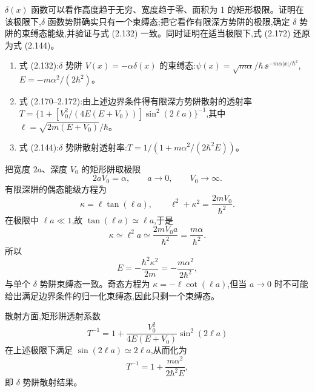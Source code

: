 \begin{question}
$\delta(x)$ 函数可以看作高度趋于无穷、宽度趋于零、面积为 1 的矩形极限。证明在该极限下,$\delta$ 函数势阱确实只有一个束缚态;把它看作有限深方势阱的极限,确定 $\delta$ 势阱的束缚态能级,并验证与式 (2.132) 一致。同时证明在适当极限下,式 (2.172) 还原为式 (2.144)。

\par\smallskip
{}
\begin{enumerate}[leftmargin=2.2em,itemsep=0.12em,topsep=0.12em,parsep=0pt]
\item 式 (2.132):$\delta$ 势阱 $V(x)=-\alpha\delta(x)$ 的束缚态:$\psi(x)=\sqrt{m\alpha}/\hbar\,\ee^{-m\alpha|x|/\hbar^2}$,$E=-m\alpha^2/(2\hbar^2)$。
\item 式 (2.170--2.172):由上述边界条件得有限深方势阱散射的透射率 $T=\{1+[V_0^2/(4E(E+V_0))]\sin^2(2\ell a)\}^{-1}$,其中 $\ell=\sqrt{2m(E+V_0)}/\hbar$。
\item 式 (2.144):$\delta$ 势阱散射透射率:$T=1/(1+m\alpha^2/(2\hbar^2E))$。
\end{enumerate}

\end{question}
\begin{solution}
把宽度 $2a$、深度 $V_0$ 的矩形阱取极限
\[
2aV_0=\alpha,
\qquad a\to0,
\qquad V_0\to\infty.
\]
有限深阱的偶态能级方程为
\[
\kappa=\ell\tan(\ell a),
\qquad
\ell^2+\kappa^2=\frac{2mV_0}{\hbar^2}.
\]
在极限中 $\ell a\ll1$,故 $\tan(\ell a)\simeq \ell a$,于是
\[
\kappa\simeq \ell^2a\simeq \frac{2mV_0a}{\hbar^2}=\frac{m\alpha}{\hbar^2}.
\]
所以
\[
E=-\frac{\hbar^2\kappa^2}{2m}=-\frac{m\alpha^2}{2\hbar^2},
\]
与单个 $\delta$ 势阱束缚态一致。奇态方程为 $\kappa=-\ell\cot(\ell a)$,但当 $a\to0$ 时不可能给出满足边界条件的归一化束缚态,因此只剩一个束缚态。

散射方面,矩形阱透射系数
\[
T^{-1}=1+\frac{V_0^2}{4E(E+V_0)}\sin^2(2\ell a)
\]
在上述极限下满足 $\sin(2\ell a)\simeq 2\ell a$,从而化为
\[
T^{-1}=1+\frac{m\alpha^2}{2\hbar^2E},
\]
即 $\delta$ 势阱散射结果。
\end{solution}

